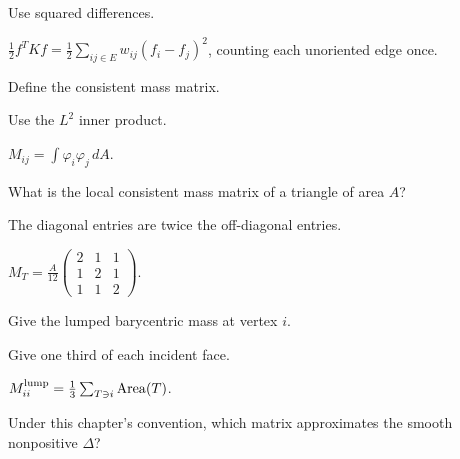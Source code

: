 \begin{hint}
Use squared differences.
\end{hint}

\begin{solution}
\(\tfrac12f^TKf=\tfrac12\sum_{ij\in E}w_{ij}(f_i-f_j)^2\), counting each unoriented edge once.
\end{solution}

\begin{exercise}\label{exr:vii41-11}
Define the consistent mass matrix.
\end{exercise}

\begin{hint}
Use the \(L^2\) inner product.
\end{hint}

\begin{solution}
\(M_{ij}=\int\varphi_i\varphi_j\,dA\).
\end{solution}

\begin{exercise}\label{exr:vii41-12}
What is the local consistent mass matrix of a triangle of area \(A\)?
\end{exercise}

\begin{hint}
The diagonal entries are twice the off-diagonal entries.
\end{hint}

\begin{solution}
\(M_T=\frac{A}{12}\begin{pmatrix}2&1&1\\1&2&1\\1&1&2\end{pmatrix}\).
\end{solution}

\begin{exercise}\label{exr:vii41-13}
Give the lumped barycentric mass at vertex \(i\).
\end{exercise}

\begin{hint}
Give one third of each incident face.
\end{hint}

\begin{solution}
\(M_{ii}^{\rm lump}=\frac13\sum_{T\ni i}\operatorname{Area}(T)\).
\end{solution}

\begin{exercise}\label{exr:vii41-14}
Under this chapter's convention, which matrix approximates the smooth nonpositive \(\Delta\)?
\end{exercise}

